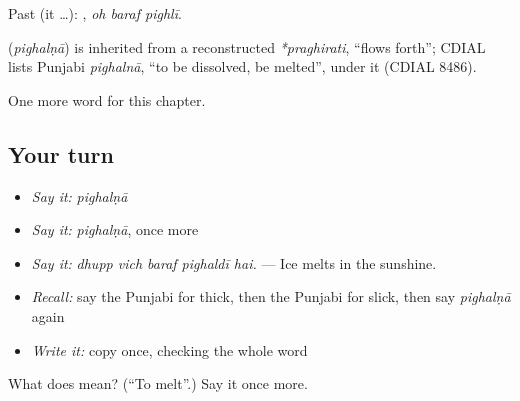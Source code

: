 Past (it …):   , \emph{oh baraf pighlī}.

\begin{cousinweb}
\textbf{} (\emph{pighalṇā}) is inherited from a reconstructed \emph{*praghirati}, \textquotedblleft{}flows forth\textquotedblright{}; CDIAL lists Punjabi \emph{pighalnā}, \textquotedblleft{}to be dissolved, be melted\textquotedblright{}, under it (CDIAL 8486).
\end{cousinweb}

\begin{grammarlens}[title={What you've built}]
One more word for this chapter.
\end{grammarlens}

\subsection*{Your turn}
\begin{itemize}
\raggedright
  \item \emph{Say it:} \emph{pighalṇā}
  \item \emph{Say it:} \emph{pighalṇā}, once more
  \item \emph{Say it:} \emph{dhupp vich baraf pighaldī hai.} — Ice melts in the sunshine.
  \item \emph{Recall:} say the Punjabi for thick, then the Punjabi for slick, then say \emph{pighalṇā} again
  \item \emph{Write it:} copy \textbf{} once, checking the whole word
\end{itemize}

\begin{tcolorbox}[breakable,colback=teal!4,colframe=teal!35!black,title={Before you move on}]
What does  mean? (\textquotedblleft{}To melt\textquotedblright{}.) Say it once more.
\end{tcolorbox}
